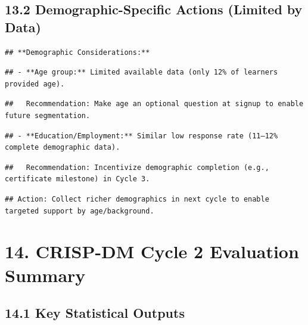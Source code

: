 \documentclass[
]{article}
\begin{document}
\subsection{13.2 Demographic-Specific Actions (Limited by
Data)}\label{demographic-specific-actions-limited-by-data}

\begin{verbatim}
## **Demographic Considerations:**
\end{verbatim}

\begin{verbatim}
## - **Age group:** Limited available data (only 12% of learners provided age).
\end{verbatim}

\begin{verbatim}
##   Recommendation: Make age an optional question at signup to enable future segmentation.
\end{verbatim}

\begin{verbatim}
## - **Education/Employment:** Similar low response rate (11–12% complete demographic data).
\end{verbatim}

\begin{verbatim}
##   Recommendation: Incentivize demographic completion (e.g., certificate milestone) in Cycle 3.
\end{verbatim}

\begin{verbatim}
## Action: Collect richer demographics in next cycle to enable targeted support by age/background.
\end{verbatim}

\section{14. CRISP-DM Cycle 2 Evaluation
Summary}\label{crisp-dm-cycle-2-evaluation-summary}

\subsection{14.1 Key Statistical Outputs}\label{key-statistical-outputs}
\end{document}
